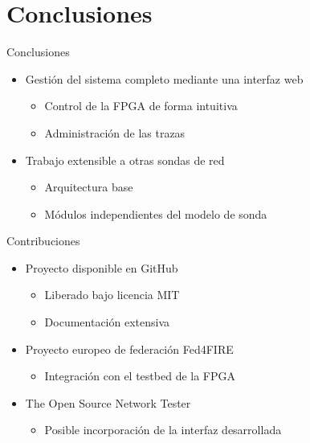 \section{Conclusiones}

\begin{frame}{Conclusiones}
  \begin{itemize}
    \item Gestión del sistema completo mediante una interfaz web
    \begin{itemize}
      \item Control de la FPGA de forma intuitiva
      \item Administración de las trazas
    \end{itemize}
    \item Trabajo extensible a otras sondas de red
    \begin{itemize}
      \item Arquitectura base
      \item Módulos independientes del modelo de sonda
    \end{itemize}
  \end{itemize}
\end{frame}

\begin{frame}{Contribuciones}
  \begin{itemize}
    \item Proyecto disponible en GitHub
    \begin{itemize}
      \item Liberado bajo licencia MIT
      \item Documentación extensiva
    \end{itemize}
    \item Proyecto europeo de federación Fed4FIRE
    \begin{itemize}
      \item Integración con el testbed de la FPGA
    \end{itemize}
    \item The Open Source Network Tester
    \begin{itemize}
      \item Posible incorporación de la interfaz desarrollada
    \end{itemize}
  \end{itemize}
\end{frame}
